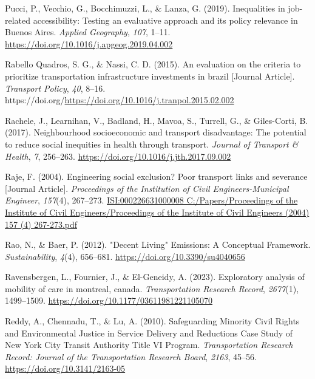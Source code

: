 \documentclass[
  letterpaper,
  DIV=11,
  numbers=noendperiod]{scrartcl}
\newlength{\cslhangindent}
\newenvironment{CSLReferences}[2] %
 {\begin{list}{}{%
  \setlength{\itemindent}{0pt}
  \setlength{\leftmargin}{0pt}
  \setlength{\parsep}{0pt}
  \ifodd #1
   \setlength{\leftmargin}{\cslhangindent}
   \setlength{\itemindent}{-1\cslhangindent}
  \fi
  \setlength{\itemsep}{#2\baselineskip}}}
 {\end{list}}
\begin{document}
\begin{CSLReferences}{1}{0}
Pucci, P., Vecchio, G., Bocchimuzzi, L., \& Lanza, G. (2019).
Inequalities in job-related accessibility: {Testing} an evaluative
approach and its policy relevance in {Buenos Aires}. \emph{Applied
Geography}, \emph{107}, 1--11.
\url{https://doi.org/10.1016/j.apgeog.2019.04.002}

Rabello Quadros, S. G., \& Nassi, C. D. (2015). An evaluation on the
criteria to prioritize transportation infrastructure investments in
brazil {[}Journal Article{]}. \emph{Transport Policy}, \emph{40}, 8--16.
https://doi.org/\url{https://doi.org/10.1016/j.tranpol.2015.02.002}

Rachele, J., Learnihan, V., Badland, H., Mavoa, S., Turrell, G., \&
Giles-Corti, B. (2017). Neighbourhood socioeconomic and transport
disadvantage: {The} potential to reduce social inequities in health
through transport. \emph{Journal of Transport \& Health}, \emph{7},
256--263. \url{https://doi.org/10.1016/j.jth.2017.09.002}

Raje, F. (2004). Engineering social exclusion? Poor transport links and
severance {[}Journal Article{]}. \emph{Proceedings of the Institution of
Civil Engineers-Municipal Engineer}, \emph{157}(4), 267--273.
\href{https://ISI:000226631000008\%0AC:/Papers/Proceedings\%20of\%20the\%20Institute\%20of\%20Civil\%20Engineers/Proceedings\%20of\%20the\%20Institute\%20of\%20Civil\%20Engineers\%20(2004)\%20157\%20(4)\%20267-273.pdf}{ISI:000226631000008
C:/Papers/Proceedings of the Institute of Civil Engineers/Proceedings of
the Institute of Civil Engineers (2004) 157 (4) 267-273.pdf}

Rao, N., \& Baer, P. (2012). "{Decent Living}" {Emissions}: {A
Conceptual Framework}. \emph{Sustainability}, \emph{4}(4), 656--681.
\url{https://doi.org/10.3390/su4040656}

Ravensbergen, L., Fournier, J., \& El-Geneidy, A. (2023). Exploratory
analysis of mobility of care in montreal, canada. \emph{Transportation
Research Record}, \emph{2677}(1), 1499--1509.
\url{https://doi.org/10.1177/03611981221105070}

Reddy, A., Chennadu, T., \& Lu, A. (2010). Safeguarding {Minority Civil
Rights} and {Environmental Justice} in {Service Delivery} and
{Reductions Case Study} of {New York City Transit Authority Title VI
Program}. \emph{Transportation Research Record: Journal of the
Transportation Research Board}, \emph{2163}, 45--56.
\url{https://doi.org/10.3141/2163-05}


\end{CSLReferences}
\end{document}
